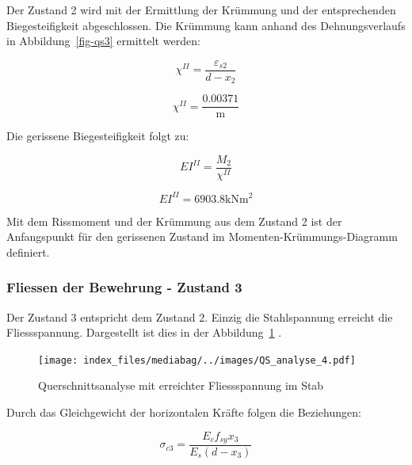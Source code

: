 \documentclass[
  12pt,
  letterpaper,
  egregdoesnotlikesansseriftitles]{scrreprt}
\begin{document}
Der Zustand 2 wird mit der Ermittlung der Krümmung und der
entsprechenden Biegesteifigkeit abgeschlossen. Die Krümmung kann anhand
des Dehnungsverlaufs in Abbildung~\ref{fig-qs3} ermittelt werden:

\begin{equation}\chi^{II} = \frac{\varepsilon_{s2}}{d - x_{2}}\end{equation}

\begin{equation}\chi^{II} = \frac{0.00371}{\text{m}}\end{equation}

Die gerissene Biegesteifigkeit folgt zu:

\begin{equation}EI^{II} = \frac{M_{2}}{\chi^{II}}\end{equation}

\begin{equation}EI^{II} = 6903.8 \text{kN} \text{m}^{2}\end{equation}

Mit dem Rissmoment und der Krümmung aus dem Zustand 2 ist der
Anfangspunkt für den gerissenen Zustand im Momenten-Krümmungs-Diagramm
definiert.

\hypertarget{fliessen-der-bewehrung---zustand-3}{%
\subsubsection{Fliessen der Bewehrung - Zustand
3}\label{fliessen-der-bewehrung---zustand-3}}

Der Zustand 3 entspricht dem Zustand 2. Einzig die Stahlspannung
erreicht die Fliessspannung. Dargestellt ist dies in der
Abbildung~\ref{fig-qs4} .

\begin{figure}[H]

{\centering \texttt{[image: index\_files/mediabag/../images/QS\_analyse\_4.pdf]}

}

\caption{\label{fig-qs4}Querschnittsanalyse mit erreichter
Fliessspannung im Stab}

\end{figure}

Durch das Gleichgewicht der horizontalen Kräfte folgen die Beziehungen:

\begin{equation}\sigma_{c 3} = \frac{E_{c} f_{sy} x_{3}}{E_{s} \left(d - x_{3}\right)}\end{equation}
\end{document}
